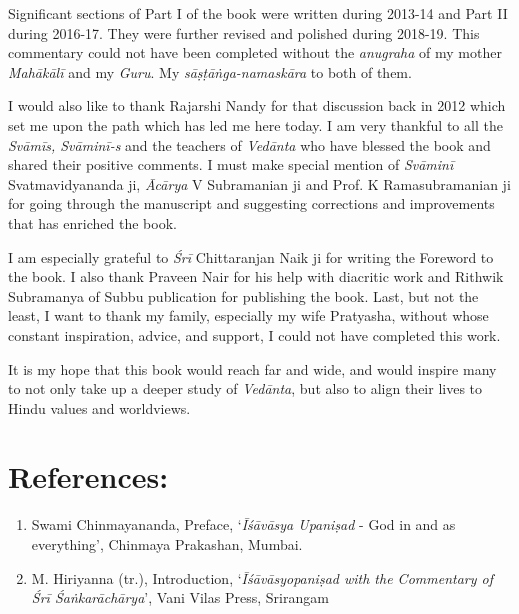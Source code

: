 Significant sections of Part I of the book were written during 2013-14 and Part II during 2016-17. They were further revised and polished during 2018-19. This commentary could not have been completed without the \emph{anugraha} of my mother \emph{Mahākālī} and my \emph{Guru}. My \emph{sāṣṭāṅga-namaskāra} to both of them.

I would also like to thank Rajarshi Nandy for that discussion back in 2012 which set me upon the path which has led me here today. I am very thankful to all the \emph{Svāmīs, Svāminī-s} and the teachers of \emph{Vedānta} who have blessed the book and shared their positive comments. I must make special mention of \emph{Svāminī} Svatmavidyananda ji, \emph{Ācārya} V Subramanian ji and Prof. K Ramasubramanian ji for going through the manuscript and suggesting corrections and improvements that has enriched the book.

I am especially grateful to \emph{Śrī} Chittaranjan Naik ji for writing the Foreword to the book. I also thank Praveen Nair for his help with diacritic work and Rithwik Subramanya of Subbu publication for publishing the book. Last, but not the least, I want to thank my family, especially my wife Pratyasha, without whose constant inspiration, advice, and support, I could not have completed this work.

It is my hope that this book would reach far and wide, and would inspire many to not only take up a deeper study of \emph{Vedānta}, but also to align their lives to Hindu values and worldviews.

\section*{References:}

\begin{enumerate}
\item Swami Chinmayananda, Preface, `\emph{Īśāvāsya Upaniṣad} - God in and as everything', Chinmaya Prakashan, Mumbai.
\item M. Hiriyanna (tr.), Introduction, `\emph{Īśāvāsyopaniṣad with the Commentary of Śrī Śaṅkarāchārya}', Vani Vilas Press, Srirangam
\end{enumerate}
